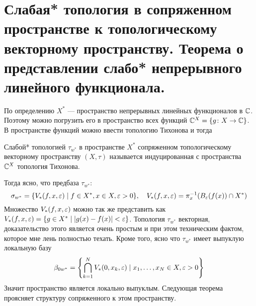 \newpage
\section{Слабая* топология в сопряженном пространстве к топологическому векторному пространству. Теорема о представлении слабо* непрерывного линейного функционала.}

По определению $X^*$ --- пространство непрерывных линейных функционалов в $\mathbb{C}$. Поэтому можно погрузить его в пространство всех функций $\mathbb{C}^X = \{g \colon X \to \mathbb{C}\}$. В пространстве функций можно ввести топологию Тихонова и тогда 
\begin{definition}
	Слабой* топологией $\tau_{w^*}$ в пространстве $X^*$ сопряженном топологическому векторному пространству $(X,\tau)$ называется индуцированная с пространства $\mathbb{C}^X$ топология Тихонова. 
\end{definition}
Тогда ясно, что предбаза $\tau_{w^*}$:
$$
\sigma_{w^*} = \{V_*(f,x,\varepsilon) \mid f \in X^*, x\in X, \varepsilon > 0\}, \quad V_*(f,x,\varepsilon) = \pi_x^{-1}(B_\varepsilon(f(x)) \cap X^*)
$$
Множество $V_*(f,x,\varepsilon)$ можно так же представить как $V_*(f,x,\varepsilon) = \{g \in X^* \mid |g(x) -f(x)| < \varepsilon\}$. Топология $\tau_{w^*}$ векторная, доказательство этого является очень простым и при этом техническим фактом, которое мне лень полностью техать. Кроме того, ясно что $\tau_{w^*}$ имеет выпуклую локальную базу
$$
\beta_{0w^*} = \left\{\bigcap_{k=1}^N V_*(0,x_k, \varepsilon) \mid x_1,\dots, x_N \in X, \varepsilon > 0\right\}
$$ Значит пространство является локально выпуклым. Следующая теорема проясняет структуру сопряженного к этом пространству.

